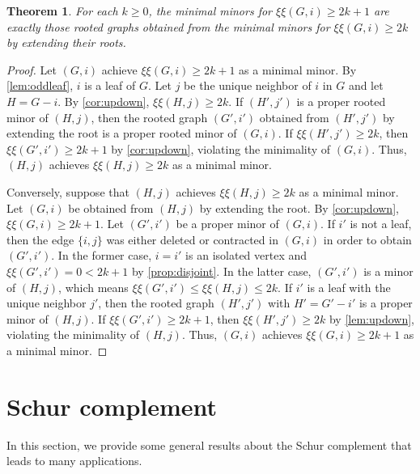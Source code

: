 \documentclass{article}
\newtheorem{theorem}{Theorem}[section]
\theoremstyle{definition}
\newcommand{\excise}{\xi\xi}
\begin{document}
\begin{theorem}
\label{thm:2k2kp1}
For each $k \geq 0$, the minimal minors for $\excise(G, i) \geq 2k + 1$ are exactly those rooted graphs obtained from the minimal minors for $\excise(G, i) \geq 2k$ by extending their roots.
\end{theorem}
\begin{proof}
Let $(G,i)$ achieve $\excise(G, i) \geq 2k + 1$ as a minimal minor.
By \cref{lem:oddleaf}, $i$ is a leaf of $G$.  Let $j$ be the unique neighbor of $i$ in $G$ and let $H = G - i$.  By \cref{cor:updown}, $\excise(H,j) \geq 2k$.  If $(H',j')$ is a proper rooted minor of $(H,j)$, then the rooted graph $(G',i')$ obtained from $(H',j')$ by extending the root is a proper rooted minor of $(G,i)$.  If $\excise(H',j') \geq 2k$, then  $\excise(G',i') \geq 2k+1$ by \cref{cor:updown}, violating the minimality of $(G,i)$.  Thus, $(H,j)$ achieves $\excise(H, j) \geq 2k$ as a minimal minor.  

Conversely, suppose that $(H,j)$ achieves $\excise(H, j) \geq 2k$ as a minimal minor.  Let $(G,i)$ be obtained from $(H,j)$ by extending the root.  By \cref{cor:updown}, $\excise(G,i) \geq 2k + 1$.  Let $(G',i')$ be a proper minor of $(G,i)$.  If $i'$ is not a leaf, then the edge $\{i,j\}$ was either deleted or contracted in $(G,i)$ in order to obtain $(G',i')$.  In the former case, $i = i'$ is an isolated vertex and $\excise(G',i') = 0 < 2k+1$ by \cref{prop:disjoint}.  In the latter case, $(G',i')$ is a minor of $(H,j)$, which means $\excise(G',i') \leq \excise(H,j) \leq 2k$.  If $i'$ is a leaf with the unique neighbor $j'$,  then the rooted graph $(H',j')$ with $H' = G' - i'$ is a proper minor of $(H,j)$.  If $\excise(G',i') \geq 2k + 1$, then $\excise(H',j') \geq 2k$ by \cref{lem:updown}, violating the minimality of $(H,j)$.  Thus, $(G,i)$ achieves $\excise(G, i) \geq 2k + 1$ as a minimal minor.
\end{proof}

\section{Schur complement}
\label{sec:schur}
In this section, we provide some general results about the Schur complement that leads to many applications.
\end{document}
